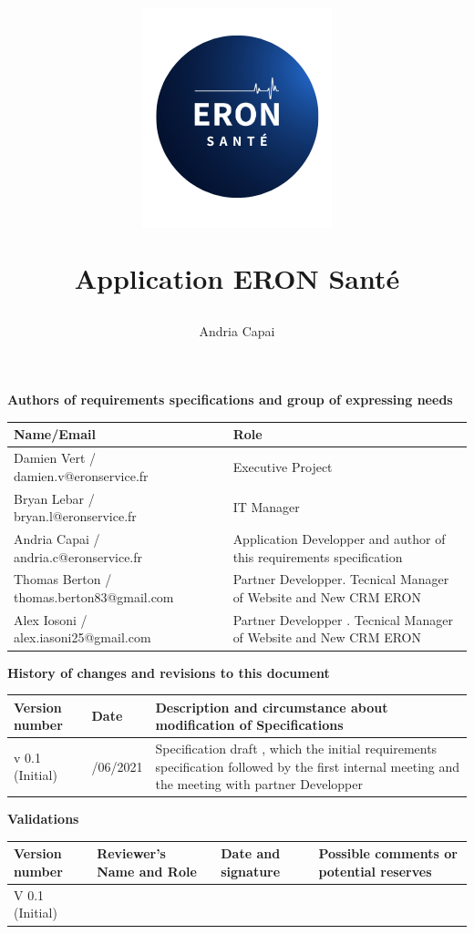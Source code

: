 \documentclass[
  12pt,
]{article}
\title{\includegraphics{logo.png}

Application ERON Santé}
\author{Andria Capai}
\date{}
\begin{document}
\maketitle

{
\setcounter{tocdepth}{3}
\tableofcontents
}
\textbf{Authors of requirements specifications and group of expressing
needs}

\begin{longtable}[]{@{}
  >{\raggedright\arraybackslash}p{}
  >{\raggedright\arraybackslash}p{}@{}}
\toprule
Name/Email & Role \\
\midrule
\endhead
Damien Vert / damien.v@eronservice.fr & Executive Project \\
Bryan Lebar / bryan.l@eronservice.fr & IT Manager \\
Andria Capai / andria.c@eronservice.fr & Application Developper and
author of this requirements specification \\
Thomas Berton / thomas.berton83@gmail.com & Partner Developper. Tecnical
Manager of Website and New CRM ERON \\
Alex Iosoni / alex.iasoni25@gmail.com & Partner Developper . Tecnical
Manager of Website and New CRM ERON \\
\bottomrule
\end{longtable}

\textbf{History of changes and revisions to this document}

\begin{longtable}[]{@{}
  >{\raggedright\arraybackslash}p{}
  >{\raggedright\arraybackslash}p{}
  >{\raggedright\arraybackslash}p{}@{}}
\toprule
Version number & Date & Description and circumstance about modification
of Specifications \\
\midrule
\endhead
v 0.1 (Initial) & 07/06/2021 & Specification draft , which the initial
requirements specification followed by the first internal meeting and
the meeting with partner Developper \\
\bottomrule
\end{longtable}

\textbf{Validations}

\begin{longtable}[]{@{}
  >{\raggedright\arraybackslash}p{}
  >{\raggedright\arraybackslash}p{}
  >{\raggedright\arraybackslash}p{}
  >{\raggedright\arraybackslash}p{}@{}}
\toprule
Version number & Reviewer's Name and Role & Date and signature &
Possible comments or potential reserves \\
\midrule
\endhead
V 0.1 (Initial) & & & \\
\bottomrule
\end{longtable}
\end{document}
